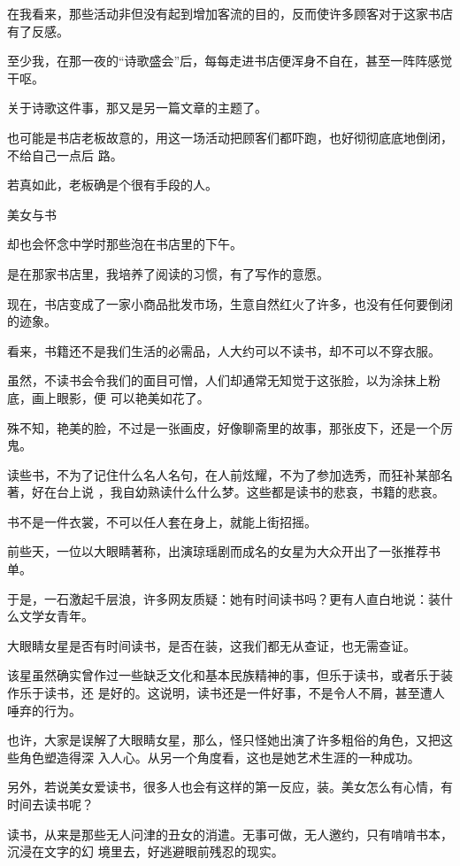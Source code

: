 \documentclass[12pt,a4paper]{article}
\newcommand{\subpart}[1]{
	\begingroup \par
	\vspace{1ex} \centering #1
	\par \endgroup
}
\begin{document}
		在我看来，那些活动非但没有起到增加客流的目的，反而使许多顾客对于这家书店有了反感。\par
		至少我，在那一夜的“诗歌盛会”后，每每走进书店便浑身不自在，甚至一阵阵感觉干呕。\par
		关于诗歌这件事，那又是另一篇文章的主题了。

		也可能是书店老板故意的，用这一场活动把顾客们都吓跑，也好彻彻底底地倒闭，不给自己一点后
	路。

		若真如此，老板确是个很有手段的人。


		\subpart{美女与书}

		却也会怀念中学时那些泡在书店里的下午。

		是在那家书店里，我培养了阅读的习惯，有了写作的意愿。\par
		现在，书店变成了一家小商品批发市场，生意自然红火了许多，也没有任何要倒闭的迹象。\par
		看来，书籍还不是我们生活的必需品，人大约可以不读书，却不可以不穿衣服。

		虽然，不读书会令我们的面目可憎，人们却通常无知觉于这张脸，以为涂抹上粉底，画上眼影，便
	可以艳美如花了。

		殊不知，艳美的脸，不过是一张画皮，好像聊斋里的故事，那张皮下，还是一个厉鬼。

		读些书，不为了记住什么名人名句，在人前炫耀，不为了参加选秀，而狂补某部名著，好在台上说
	，我自幼熟读什么什么梦。这些都是读书的悲哀，书籍的悲哀。

		书不是一件衣裳，不可以任人套在身上，就能上街招摇。

		前些天，一位以大眼睛著称，出演琼瑶剧而成名的女星为大众开出了一张推荐书单。\par
		于是，一石激起千层浪，许多网友质疑：她有时间读书吗？更有人直白地说：装什么文学女青年。\par
		大眼睛女星是否有时间读书，是否在装，这我们都无从查证，也无需查证。

		该星虽然确实曾作过一些缺乏文化和基本民族精神的事，但乐于读书，或者乐于装作乐于读书，还
	是好的。这说明，读书还是一件好事，不是令人不屑，甚至遭人唾弃的行为。

		也许，大家是误解了大眼睛女星，那么，怪只怪她出演了许多粗俗的角色，又把这些角色塑造得深
	入人心。从另一个角度看，这也是她艺术生涯的一种成功。

		另外，若说美女爱读书，很多人也会有这样的第一反应，装。美女怎么有心情，有时间去读书呢？

		读书，从来是那些无人问津的丑女的消遣。无事可做，无人邀约，只有啃啃书本，沉浸在文字的幻
	境里去，好逃避眼前残忍的现实。
\end{document}
